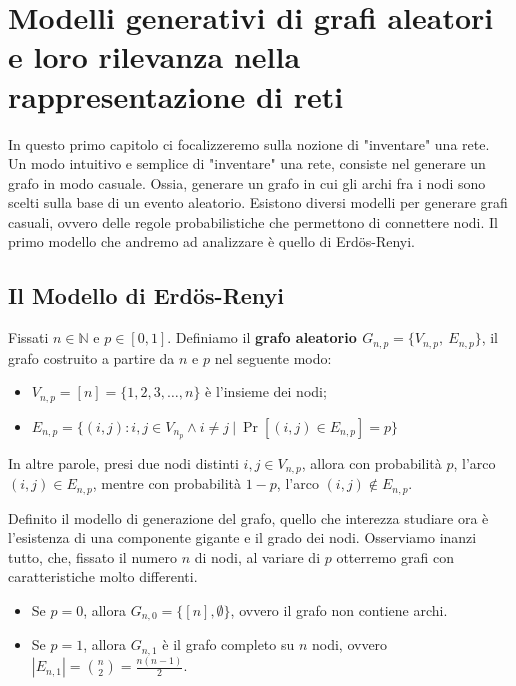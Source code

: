 \chapter{Modelli generativi di grafi aleatori e loro rilevanza nella rappresentazione di reti}

In questo primo capitolo ci focalizzeremo sulla nozione di "inventare" una rete. Un modo intuitivo e semplice di "inventare" una rete, consiste nel generare un grafo in modo casuale. Ossia, generare un grafo in cui gli archi fra i nodi sono scelti sulla base di un evento aleatorio. Esistono diversi modelli per generare grafi casuali, ovvero delle regole probabilistiche che permettono di connettere nodi. Il primo modello che andremo ad analizzare è quello di Erd\"{o}s-Renyi. 

\section{Il Modello di Erd\"{o}s-Renyi}

\begin{definizione}
    Fissati $n \in \mathbb{N}$ e $p \in [0,1]$. Definiamo il \textbf{grafo aleatorio $G_{n,p} = \{V_{n,p},\ E_{n,p}\}$}, il grafo costruito a partire da $n$ e $p$ nel seguente modo:
    \begin{itemize}
        \item $V_{n,p} = [n] = \{1, 2, 3, \dots, n\}$ è l'insieme dei nodi;
        \item $E_{n, p} = \{(i, j): i,j \in V_{n_p} \land i \neq j\ |\ \Pr[(i, j) \in E_{n, p}] = p\}$
    \end{itemize}
\end{definizione}

 In altre parole, presi due nodi distinti $i, j \in V_{n,p}$, allora con probabilità $p$, l'arco $(i, j) \in E_{n, p}$, mentre con probabilità $1 - p$, l'arco $(i, j) \notin E_{n, p}$.

Definito il modello di generazione del grafo, quello che interezza studiare ora è l'esistenza di una componente gigante e il grado dei nodi. Osserviamo inanzi tutto, che, fissato il numero $n$ di nodi, al variare di $p$ otterremo grafi con caratteristiche molto differenti.

\begin{itemize}
    \item Se $p = 0$, allora $G_{n,0} = \{[n], \emptyset\}$, ovvero il grafo non contiene archi.
    \item Se $p = 1$, allora $G_{n, 1}$ è il grafo completo su $n$ nodi, ovvero $|E_{n,1}| = \binom{n}{2} = \frac{n(n - 1)}{2}$.
\end{itemize}

